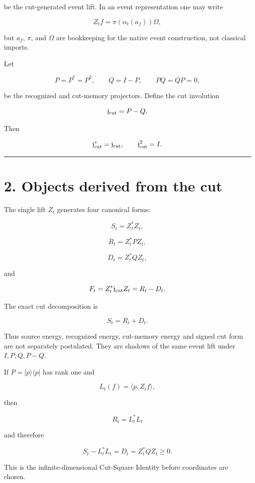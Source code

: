 be the cut-generated event lift. In an event representation one may write

\[
Z_t f=\pi(\alpha_t(a_f))\Omega,
\]

but \(a_f\), \(\pi\), and \(\Omega\) are bookkeeping for the native event
construction, not classical imports.

Let

\[
P=P^*=P^2,
\qquad
Q=I-P,
\qquad
PQ=QP=0,
\]

be the recognized and cut-memory projectors. Define the cut involution

\[
\mathfrak j_{\rm cut}=P-Q.
\]

Then

\[
\mathfrak j_{\rm cut}^*=\mathfrak j_{\rm cut},
\qquad
\mathfrak j_{\rm cut}^2=I.
\]

\begin{center}\rule{0.5\linewidth}{0.5pt}\end{center}

\hypertarget{objects-derived-from-the-cut}{%
\section{2. Objects derived from the cut}\label{objects-derived-from-the-cut}}

The single lift \(Z_t\) generates four canonical forms:

\[
S_t=Z_t^*Z_t,
\]

\[
R_t=Z_t^*PZ_t,
\]

\[
D_t=Z_t^*QZ_t,
\]

and

\[
F_t=Z_t^*\mathfrak j_{\rm cut}Z_t=R_t-D_t.
\]

The exact cut decomposition is

\[
\boxed{S_t=R_t+D_t.}
\]

Thus source energy, recognized energy, cut-memory energy and signed cut form
are not separately postulated. They are shadows of the same event lift under
\(I,P,Q,P-Q\).

If \(P=|p\rangle\langle p|\) has rank one and

\[
L_t(f)=\langle p,Z_tf\rangle,
\]

then

\[
R_t=L_t^*L_t
\]

and therefore

\[
\boxed{S_t-L_t^*L_t=D_t=Z_t^*QZ_t\ge0.}
\]

This is the infinite-dimensional Cut-Square Identity before coordinates are
chosen.

